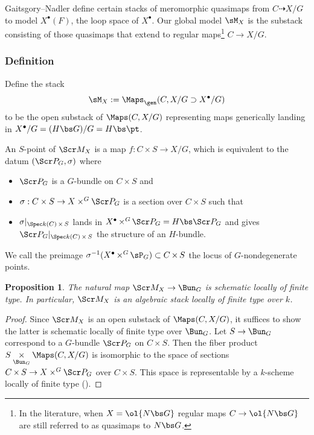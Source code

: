 \documentclass[final]{amsart}
\newtheorem{prop}[subsubsection]{Proposition}
\theoremstyle{remark}
\theoremstyle{definition}
\DeclareMathOperator*{\xt}{\times}
\numberwithin{equation}{section}
\begin{document}
Gaitsgory--Nadler \cite{GN} define certain stacks of meromorphic quasimaps from $C \dashrightarrow X/G$ 
to model $X^\bullet(F)$, the loop space of $X^\bullet$. 
Our global model $\sM_X$ is the substack consisting of those quasimaps that 
extend to regular maps\footnote{In the literature, when $X=\ol{N\bs G}$ regular maps 
$C \to \ol{N\bs G}$ are still referred to as quasimaps to $N\bs G$.} $C \to X/G$. 

\subsubsection{Definition}
Define the stack 
\[ \sM_{X} := \Maps_\gen(C, X/ G \supset X^\bullet /G) \]
to be the open substack of $\Maps(C, X/G)$ representing maps generically
landing in $X^\bullet/G = (H\bs G)/G = H\bs\pt$. 

\smallskip

An $S$-point of $\Scr M_{X}$ is a map $f : C\times S \to X/G$, which is
equivalent to the datum $(\Scr P_G, \sigma)$ where 
\begin{itemize}
\item $\Scr P_G$ is a $G$-bundle on $C\times S$ and 
\item $\sigma : C\times S \to X\times^G \Scr P_G$ is a section over $C\times S$ 
such that
\item $\sigma|_{\Spec k(C) \xt S}$ lands in $X^\bullet \xt^G \Scr P_G = H\bs \Scr P_G$
and gives $\Scr P_G |_{\Spec k(C)\xt S}$ the structure of an $H$-bundle.
\end{itemize}
We call the preimage $\sigma^{-1}(X^\bullet \xt^G \sP_G)\subset C \xt S$ the 
locus of $G$-nondegenerate points. 

\begin{prop}
The natural map $\Scr M_{X} \to \Bun_G$ is schematic locally of finite type. 
In particular, $\Scr M_{X}$ is an algebraic stack locally of finite type over $k$.
\end{prop}
\begin{proof}
Since $\Scr M_{X}$ is an open substack of $\Maps(C, X/G)$,
it suffices to show the latter is schematic locally of finite type
over $\Bun_G$. 
Let $S \to \Bun_G$ correspond to a $G$-bundle $\Scr P_G$ on $C\xt S$.
Then the fiber product $S \underset{\Bun_G}\times \Maps(C, X/G)$ 
is isomorphic to the space of sections $C\xt S \to X \times^G \Scr P_G$ over $C \xt S$.
This space is representable by a $k$-scheme locally of finite type 
(\cite[Theorem 5.23]{FGA-explained}). 
\end{proof}
\end{document}
